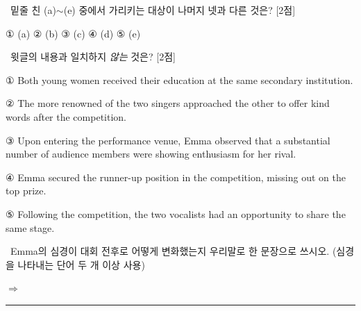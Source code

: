\documentclass[11pt,a4paper]{article}
\newcommand{\qno}[1]{\par\vspace{8pt}\noindent{\sffamily\bfseries #1.}\ }
\newcommand{\instr}[1]{{\sffamily #1}\par\vspace{3pt}}
\begin{document}
\vspace{4pt}

\qno{2}\instr{밑줄 친 (a)$\sim$(e) 중에서 가리키는 대상이 나머지 넷과 다른 것은? [2점]}
\begin{choices}
\item ① (a) \quad ② (b) \quad ③ (c) \quad ④ (d) \quad ⑤ (e)
\end{choices}

\vspace{4pt}

\qno{3}\instr{윗글의 내용과 일치하지 \emph{않는} 것은? [2점]}
\begin{choices}
\item ① Both young women received their education at the same secondary institution.
\item ② The more renowned of the two singers approached the other to offer kind words after
the competition.
\item ③ Upon entering the performance venue, Emma observed that a substantial number of
audience members were showing enthusiasm for her rival.
\item ④ Emma secured the runner-up position in the competition, missing out on the top prize.
\item ⑤ Following the competition, the two vocalists had an opportunity to share the same stage.
\end{choices}

\vspace{4pt}

\qno{4}\instr{[서술형] Emma의 심경이 대회 전후로 어떻게 변화했는지 우리말로 한 문장으로 쓰시오.
(심경을 나타내는 단어 두 개 이상 사용)}
\par\vspace{2pt}
\noindent$\Rightarrow$ \rule{0.89\linewidth}{0.4pt}
\end{document}
